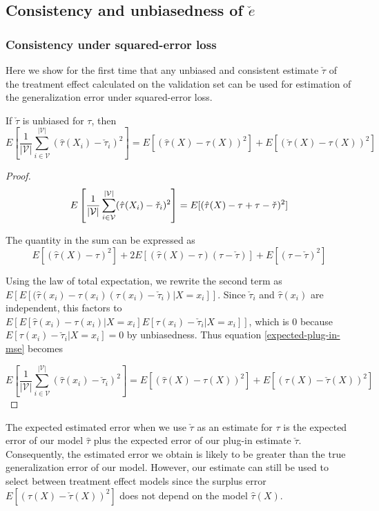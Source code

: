 \subsection{Consistency and unbiasedness of $\check e$}

\subsubsection{Consistency under squared-error loss}

Here we show for the first time that any unbiased and consistent estimate $\check\tau$ of the treatment effect calculated on the validation set can be used for estimation of the generalization error under squared-error loss. 

\begin{lemma}
If $\check\tau$ is unbiased for $\tau$, then 
\[
E\left[\frac{1}{|\mathcal{V}|}\sum_{i \in \mathcal{V}}^{|\mathcal{V}|}  (\hat \tau(X_i) - \check \tau_i)^2\right] = E[(\hat\tau(X) - \tau(X))^2] + E[(\check\tau(X) - \tau(X))^2]
\]
\end{lemma}

\begin{proof}
\begin{equation}
	E\left[ \frac{1}{|\mathcal{V}|}\sum_{i \in \mathcal{V}}^{|\mathcal{V}|}  (\hat \tau(X_i) - \check \tau_i)^2 \right]  
	= 
	E[ (\hat \tau(X) - \tau + \tau  - \check \tau)^2 ] \\
\label{expected-plug-in-mse}
\end{equation}

The quantity in the sum can be expressed as
\[
E[ (\hat \tau(X) - \tau)^2] + 2E[(\hat \tau(X) - \tau)(\tau - \check\tau)] + E[(\tau - \check\tau)^2]
\]

Using the law of total expectation, we rewrite the second term as $E[E[(\hat \tau(x_i) - \tau(x_i)(\tau(x_i) - \check\tau_i)|X=x_i]]$. Since $\check\tau_i$ and $\hat\tau(x_i)$ are independent, this factors to $E[E[\hat \tau(x_i) - \tau(x_i)|X=x_i]E[\tau(x_i) - \check\tau_i|X=x_i]]$, which is $0$ because $E[\tau(x_i) - \check\tau_i|X=x_i] = 0$ by unbiasedness. Thus equation \ref{expected-plug-in-mse} becomes

\[
	E\left[ \frac{1}{|\mathcal{V}|}\sum_{i \in \mathcal{V}}^{|\mathcal{V}|}  (\hat \tau(x_i) - \check \tau_i)^2 \right]  
	=
	E[ (\hat \tau(X) - \tau(X))^2] + E[(\tau(X) - \check\tau(X))^2]
\]

\end{proof}

The expected estimated error when we use $\check\tau$ as an estimate for $\tau$ is the expected error of our model $\hat\tau$ plus the expected error of our plug-in estimate $\check\tau$. Consequently, the estimated error we obtain is likely to be greater than the true generalization error of our model. However, our estimate can still be used to select between treatment effect models since the surplus error $E[(\tau(X) - \check\tau(X))^2]$ does not depend on the model $\hat \tau(X)$. 

